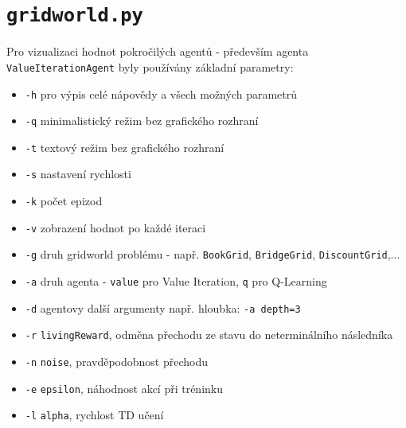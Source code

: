 \section{\texttt{gridworld.py}}
Pro vizualizaci hodnot pokročilých agentů - především agenta \texttt{ValueIterationAgent} byly používány základní parametry:
\begin{itemize}
\item \texttt{-h} pro výpis celé nápovědy a všech možných parametrů
\item \texttt{-q} minimalistický režim bez grafického rozhraní
\item \texttt{-t} textový režim bez grafického rozhraní
\item \texttt{-s} nastavení rychlosti
\item \texttt{-k} počet epizod
\item \texttt{-v} zobrazení hodnot po každé iteraci
\item \texttt{-g} druh gridworld problému - např. \texttt{BookGrid}, \texttt{BridgeGrid}, \texttt{DiscountGrid},...
\item \texttt{-a} druh agenta - \texttt{value} pro Value Iteration, \texttt{q} pro Q-Learning
\item \texttt{-d} agentovy další argumenty např. hloubka: \texttt{-a depth=3}
\item \texttt{-r} \texttt{livingReward}, odměna přechodu ze stavu do neterminálního následníka
\item \texttt{-n} \texttt{noise}, pravděpodobnost přechodu 
\item \texttt{-e} \texttt{epsilon}, náhodnost akcí při tréninku
\item \texttt{-l} \texttt{alpha}, rychlost TD učení
\end{itemize}

